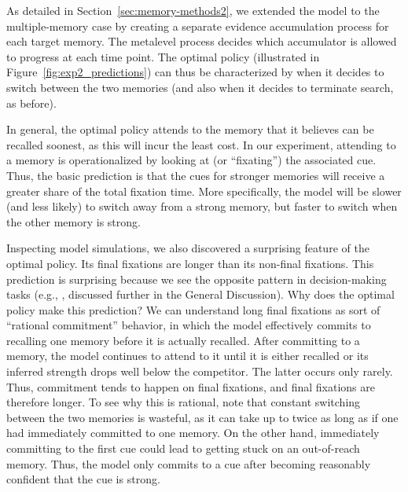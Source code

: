 As detailed in Section~\ref{sec:memory-methods2}, we extended the model to the multiple-memory case by creating a separate evidence accumulation process for each target memory. The metalevel process decides which accumulator is allowed to progress at each time point. The optimal policy (illustrated in Figure~\ref{fig:exp2_predictions}) can thus be characterized by when it decides to switch between the two memories (and also when it decides to terminate search, as before). 

In general, the optimal policy attends to the memory that it believes can be recalled soonest, as this will incur the least cost. In our experiment, attending to a memory is operationalized by looking at (or ``fixating'') the associated cue. Thus, the basic prediction is that the cues for stronger memories will receive a greater share of the total fixation time. More specifically, the model will be slower (and less likely) to switch away from a strong memory, but faster to switch when the other memory is strong.

Inspecting model simulations, we also discovered a surprising feature of the optimal policy. Its final fixations are longer than its non-final fixations. This prediction is surprising because we see the opposite pattern in decision-making tasks (e.g., \citealp{krajbich2010visual}, discussed further in the General Discussion). Why does the optimal policy make this prediction? We can understand long final fixations as sort of ``rational commitment'' behavior, in which the model effectively commits to recalling one memory before it is actually recalled. After committing to a memory, the model continues to attend to it until it is either recalled or its inferred strength drops well below the competitor. The latter occurs only rarely. Thus, commitment tends to happen on final fixations, and final fixations are therefore longer. To see why this is rational, note that constant switching between the two memories is wasteful, as it can take up to twice as long as if one had immediately committed to one memory. On the other hand, immediately committing to the first cue could lead to getting stuck on an out-of-reach memory. Thus, the model only commits to a cue after becoming reasonably confident that the cue is strong.


